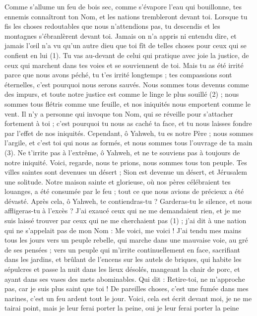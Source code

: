 \begin{multicols}{2}
{\VerseOne{}Comme s’allume un feu de bois sec, comme s’évapore l’eau qui bouillonne, tes ennemis connaîtront ton Nom, et les nations trembleront devant toi.
Lorsque tu fis les choses redoutables que nous n'attendions pas, tu descendis et les montagnes s’ébranlèrent devant toi.
Jamais on n’a appris ni entendu dire, et jamais l’œil n’a vu qu’un autre dieu que toi fît de telles choses pour ceux qui se confient en lui (1).
Tu vas au-devant de celui qui pratique avec joie la justice, de ceux qui marchent dans tes voies et se souviennent de toi. Mais tu as été irrité parce que nous avons péché, tu t’es irrité longtemps ; tes compassions sont éternelles, c'est pourquoi nous serons sauvés.
Nous sommes tous devenus comme des impurs, et toute notre justice est comme le linge le plus souillé (2) ; nous sommes tous flétris comme une feuille, et nos iniquités nous emportent comme le vent.
Il n'y a personne qui invoque ton Nom, qui se réveille pour s’attacher fortement à toi ; c'est pourquoi tu nous as caché ta face, et tu nous laisses fondre par l’effet de nos iniquités.
Cependant, ô Yahweh, tu es notre Père ; nous sommes l'argile, et c’est toi qui nous as formés, et nous sommes tous l'ouvrage de ta main (3).
Ne t’irrite pas à l’extrême, ô Yahweh, et ne te souviens pas à toujours de notre iniquité. Voici, regarde, nous te prions, nous sommes tous ton peuple.
Tes villes saintes sont devenues un désert ; Sion est devenue un désert, et Jérusalem une solitude.
Notre maison sainte et glorieuse, où nos pères célébraient tes louanges, a été consumée par le feu ; tout ce que nous avions de précieux a été dévasté.
Après cela, ô Yahweh, te contiendras-tu ? Garderas-tu le silence, et nous affligeras-tu à l’excès ?
\VerseOne{}J’ai exaucé ceux qui ne me demandaient rien, et je me suis laissé trouver par ceux qui ne me cherchaient pas (1) ; j'ai dit à une nation qui ne s'appelait pas de mon Nom : Me voici, me voici !
J'ai tendu mes mains tous les jours vers un peuple rebelle, qui marche dans une mauvaise voie, au gré de ses pensées ;
vers un peuple qui m'irrite continuellement en face, sacrifiant dans les jardins, et brûlant de l’encens sur les autels de briques,
qui habite les sépulcres et passe la nuit dans les lieux désolés, mangeant la chair de porc, et ayant dans ses vases des mets abominables.
Qui dit : Retire-toi, ne m’approche pas, car je suis plus saint que toi ! De pareilles choses, c’est une fumée dans mes narines, c’est un feu ardent tout le jour.
Voici, cela est écrit devant moi, je ne me tairai point, mais je leur ferai porter la peine, oui je leur ferai porter la peine
}
\end{multicols}
